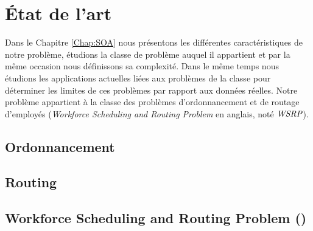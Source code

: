 
\chapter{  État de l'art \label{Chap:SOA}}

Dans le Chapitre \ref{Chap:SOA} nous présentons les différentes caractéristiques de notre problème, étudions la classe de problème auquel il appartient et par la même occasion nous définissons sa complexité. Dans le même temps nous étudions les applications actuelles liées aux problèmes de la classe pour déterminer les limites de ces problèmes par rapport aux données réelles. Notre problème appartient à la classe des problèmes d'ordonnancement et de routage d'employés (\textit{Workforce Scheduling and Routing Problem} en anglais, noté $\textit{WSRP}$).







\section{Ordonnancement \label{sec:SOA_APPAct_Ordo}}



\section{Routing \label{sec:SOA_APPAct_Routing}}



\section{Workforce Scheduling and Routing Problem (\wsrp) \label{sec:SOA_WSRP}}



